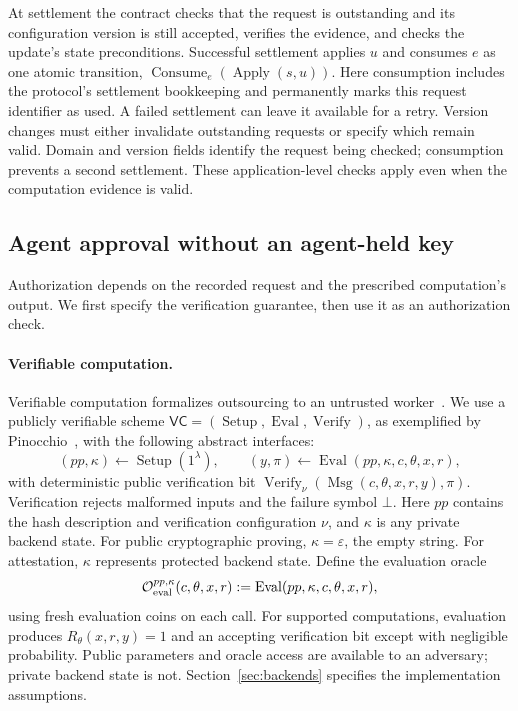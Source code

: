 \documentclass[10pt,letterpaper]{article}
\newcommand{\Verify}{\operatorname{Verify}}
\newcommand{\Msg}{\operatorname{Msg}}
\newcommand{\EvalO}{\mathcal O_{\rm eval}}
\begin{document}
At settlement the contract checks that the request is outstanding and its configuration version is still accepted, verifies the evidence, and checks the update's state preconditions. Successful settlement applies $u$ and consumes $e$ as one atomic transition, $\operatorname{Consume}_e(\operatorname{Apply}(s,u))$. Here consumption includes the protocol's settlement bookkeeping and permanently marks this request identifier as used. A failed settlement can leave it available for a retry. Version changes must either invalidate outstanding requests or specify which remain valid. Domain and version fields identify the request being checked; consumption prevents a second settlement. These application-level checks apply even when the computation evidence is valid.

\subsection{Agent approval without an agent-held key}
Authorization depends on the recorded request and the prescribed computation's output. We first specify the verification guarantee, then use it as an authorization check.

\paragraph{Verifiable computation.}
Verifiable computation formalizes outsourcing to an untrusted worker~\citep{gennaro2010}. We use a publicly verifiable scheme $\mathsf{VC}=(\operatorname{Setup},\operatorname{Eval},\Verify)$, as exemplified by Pinocchio~\citep{pinocchio2013}, with the following abstract interfaces:
\[
 (pp,\kappa)\leftarrow\operatorname{Setup}(1^\lambda),\qquad
 (y,\pi)\leftarrow\operatorname{Eval}(pp,\kappa,c,\theta,x,r),
\]
with deterministic public verification bit $\Verify_\nu(\Msg(c,\theta,x,r,y),\pi)$. Verification rejects malformed inputs and the failure symbol $\bot$. Here $pp$ contains the hash description and verification configuration $\nu$, and $\kappa$ is any private backend state. For public cryptographic proving, $\kappa=\varepsilon$, the empty string. For attestation, $\kappa$ represents protected backend state. Define the evaluation oracle
\[
 \EvalO^{pp,\kappa}(c,\theta,x,r)
 :=\operatorname{Eval}(pp,\kappa,c,\theta,x,r),
\]
using fresh evaluation coins on each call. For supported computations, evaluation produces $R_\theta(x,r,y)=1$ and an accepting verification bit except with negligible probability. Public parameters and oracle access are available to an adversary; private backend state is not. Section~\ref{sec:backends} specifies the implementation assumptions.
\end{document}
